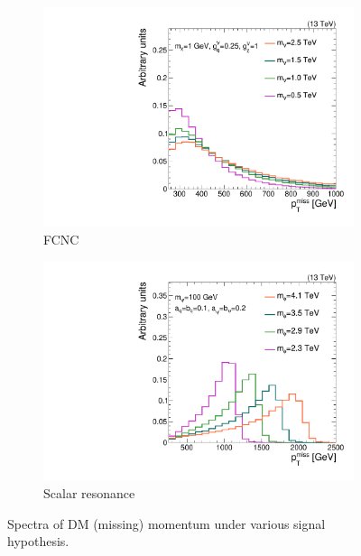 \begin{figure}[]
    \begin{center}
        \begin{subfigure}[t]{0.49\textwidth}
            \includegraphics[width=\textwidth]{figures/monotop/diagrams/fcnc_pfmet.pdf}
            \caption{FCNC}
        \end{subfigure}
        \begin{subfigure}[t]{0.49\textwidth}
            \includegraphics[width=\textwidth]{figures/monotop/diagrams/res_pfmet.pdf}
            \caption{Scalar resonance}
        \end{subfigure}
        \caption{Spectra of DM (missing) momentum under various signal hypothesis.}
        \label{fig:mt:shapes}
    \end{center}
\end{figure}

